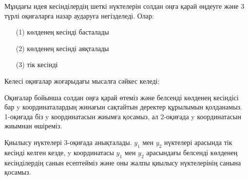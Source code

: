 Мұндағы идея кесінділердің шеткі нүктелерін солдан оңға 
қарай өңдеуге және 3 түрлі оқиғаларға назар аударуға негізделеді. Олар:
\begin{enumerate}[noitemsep]
\item[(1)] көлденең кесінді басталады %
\item[(2)] көлденең кесінді аяқталады %
\item[(3)] тік кесінді %
\end{enumerate}

Келесі оқиғалар жоғарыдағы мысалға сәйкес келеді:
\begin{center}
\end{center}

Оқиғалар бойынша солдан оңға қарай өтеміз
және белсенді көлденең кесіндісі бар 
y координаталардың жинағын сақтайтын
деректер құрылымын қолданамыз. 1-оқиғада
біз y координатасын жиымға қосамыз, ал 2-оқиғада
y координатасын жиымнан өшіреміз. 


Қиылысу нүктелері 3-оқиғада анықталады. 
$y_1$ мен $y_2$ нүктелері арасында тік кесінді 
келген кезде, y координатасы $y_1$ мен $y_2$ арасындағы
белсенді көлденең кесінділердің санын есептейміз және
оны жалпы қиылысу нүктелерінің санына қосамыз. 


